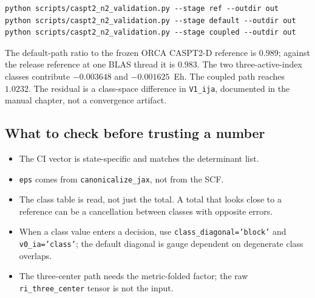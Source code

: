 \begin{lstlisting}
python scripts/caspt2_n2_validation.py --stage ref --outdir out
python scripts/caspt2_n2_validation.py --stage default --outdir out
python scripts/caspt2_n2_validation.py --stage coupled --outdir out
\end{lstlisting}

The default-path ratio to the frozen ORCA CASPT2-D reference is
$0.989$; against the release reference at one BLAS thread it is
$0.983$.  The two three-active-index classes contribute $-0.003648$ and
$-0.001625$~Eh.  The coupled path reaches $1.0232$.  The residual is a
class-space difference in \texttt{V1\_ija}, documented in the manual
chapter, not a convergence artifact.

\subsection{What to check before trusting a number}

\begin{itemize}
\item The CI vector is state-specific and matches the determinant list.
\item \texttt{eps} comes from \texttt{canonicalize\_jax}, not from the
  SCF.
\item The class table is read, not just the total.  A total that looks
  close to a reference can be a cancellation between classes with
  opposite errors.
\item When a class value enters a decision, use
  \texttt{class\_diagonal='block'} and \texttt{v0\_ia='class'}; the
  default diagonal is gauge dependent on degenerate class overlaps.
\item The three-center path needs the metric-folded factor; the raw
  \texttt{ri\_three\_center} tensor is not the input.
\end{itemize}
